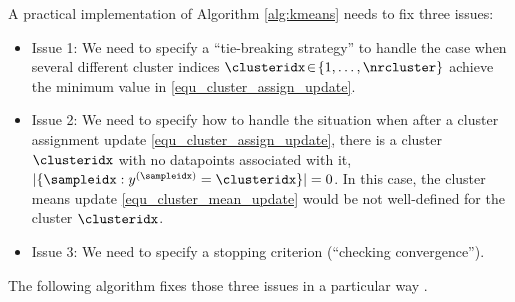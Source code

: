 \documentclass[12pt]{report}
\begin{document}
A practical implementation of Algorithm \ref{alg:kmeans} needs to fix three issues: 
\begin{itemize} 
\item Issue 1: We need to specify a ``tie-breaking strategy'' to handle the case when several different cluster indices 
$\clusteridx\!\in\!\{1,\ldots,\nrcluster\}$ achieve the minimum value in \eqref{equ_cluster_assign_update}. 
\item Issue 2: We need to specify how to handle the situation when after a cluster assignment update  \eqref{equ_cluster_assign_update}, 
there is a cluster $\clusteridx$ with no datapoints associated with it, $|\{ \sampleidx: y^{(\sampleidx)} = \clusteridx \}|=0$. 
In this case, the cluster means update \eqref{equ_cluster_mean_update} would be not well-defined for the cluster $\clusteridx$. 
\item Issue 3: We need to specify a stopping criterion (``checking convergence''). 
\end{itemize}
The following algorithm fixes those three issues in a particular way \cite{Gray1980}.  
\end{document}

